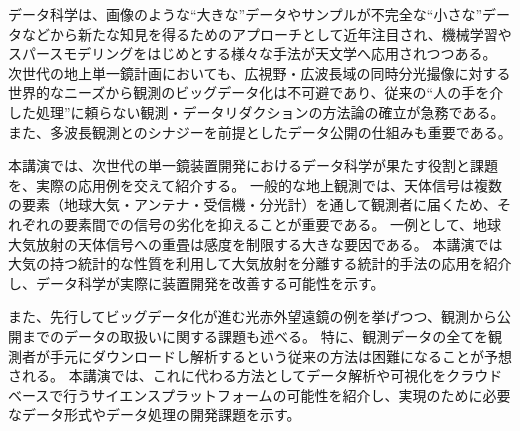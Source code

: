 \documentclass[ja]{2021b}
\begin{document}
データ科学は、画像のような``大きな''データやサンプルが不完全な``小さな''データなどから新たな知見を得るためのアプローチとして近年注目され、機械学習やスパースモデリングをはじめとする様々な手法が天文学へ応用されつつある。
次世代の地上単一鏡計画においても、広視野・広波長域の同時分光撮像に対する世界的なニーズから観測のビッグデータ化は不可避であり、従来の``人の手を介した処理''に頼らない観測・データリダクションの方法論の確立が急務である。
また、多波長観測とのシナジーを前提としたデータ公開の仕組みも重要である。

本講演では、次世代の単一鏡装置開発におけるデータ科学が果たす役割と課題を、実際の応用例を交えて紹介する。
一般的な地上観測では、天体信号は複数の要素（地球大気・アンテナ・受信機・分光計）を通して観測者に届くため、それぞれの要素間での信号の劣化を抑えることが重要である。
一例として、地球大気放射の天体信号への重畳は感度を制限する大きな要因である。
本講演では大気の持つ統計的な性質を利用して大気放射を分離する統計的手法の応用を紹介し、データ科学が実際に装置開発を改善する可能性を示す。

また、先行してビッグデータ化が進む光赤外望遠鏡の例を挙げつつ、観測から公開までのデータの取扱いに関する課題も述べる。
特に、観測データの全てを観測者が手元にダウンロードし解析するという従来の方法は困難になることが予想される。
本講演では、これに代わる方法としてデータ解析や可視化をクラウドベースで行うサイエンスプラットフォームの可能性を紹介し、実現のために必要なデータ形式やデータ処理の開発課題を示す。

\end{document}
